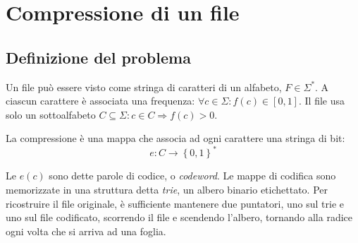 \section{Compressione di un file}

\subsection{Definizione del problema}

Un file può essere visto come stringa di caratteri di un alfabeto, $F \in \Sigma^*$. A ciascun carattere è associata una frequenza: $\forall c \in \Sigma : f(c) \in [0,1]$. Il file usa solo un sottoalfabeto $C \subseteq \Sigma : c \in C \Rightarrow f(c) > 0$.

La compressione è una mappa che associa ad ogni carattere una stringa di bit:
\[
    e : C \rightarrow \left\{ 0,1 \right\}^*
\]

Le $e(c)$ sono dette parole di codice, o \emph{codeword}.
Le mappe di codifica sono memorizzate in una struttura detta \emph{trie}, un albero binario etichettato.
Per ricostruire il file originale, è sufficiente mantenere due puntatori, uno sul trie e uno sul file codificato, scorrendo il file e scendendo l'albero, tornando alla radice ogni volta che si arriva ad una foglia.

